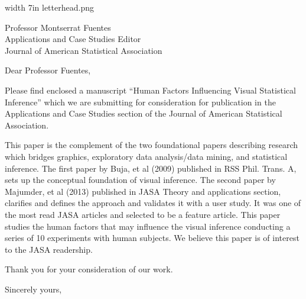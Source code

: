 \documentclass{letter}
\makeatletter
\def\apl#1#2{
\begin{letter}{#1}
\signature{Mahbubul Majumder, PhD.\\ Assistant Professor \\ Department of Mathematics \\University of Nebraska at Omaha \\ Omaha, NE 68118 \\ Phone: (402) 554 2734 \\ {\tt mmajumder@unomaha.edu} \\ with Dr. Heike Hoffman, Iowa State university and Dianne Cook, Monash University, Australia}
\opening{{Dear #2,}}

Please find enclosed a manuscript  ``Human Factors Influencing Visual Statistical Inference'' which we are
submitting for consideration for publication in the
Applications and Case Studies section of the Journal of American Statistical
Association.

This paper is the complement of the two foundational papers describing research which bridges
graphics, exploratory data analysis/data mining, and statistical
inference. The first paper by Buja, et al (2009) published in RSS Phil. Trans. A,
sets up the conceptual foundation of visual inference. The second paper by Majumder, et al (2013) published in JASA Theory and applications section, clarifies and defines the approach and validates it with a user study. It was one of the most read JASA articles and selected to be a feature article. This paper studies the human factors that may influence the visual inference conducting a series of 10 experiments with human subjects. We believe this paper is of interest to the JASA readership. 

Thank you for your consideration of our work.

\closing{Sincerely yours,
}
\end{letter}}
\makeatother
\begin{document}
{{\pdfimage width 7in {letterhead.png}}}
\apl{Professor Montserrat Fuentes\\Applications and Case Studies Editor\\Journal of American Statistical Association}{Professor Fuentes}
\end{document}
